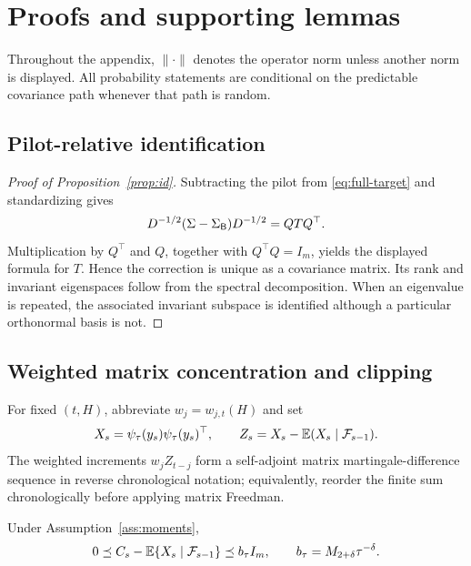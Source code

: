 \section{Proofs and supporting lemmas}
\label{app:proofs}

Throughout the appendix, $\|\cdot\|$ denotes the operator norm unless another norm is displayed.  All probability statements are conditional on the predictable covariance path whenever that path is random.

\subsection{Pilot-relative identification}

\begin{proof}[Proof of Proposition~\ref{prop:id}]
Subtracting the pilot from \eqref{eq:full-target} and standardizing gives
\begin{equation}
 D^{-1/2}(\Sigma-\Sigma_{\mathsf{B}})D^{-1/2}=QTQ^\top.
\end{equation}
Multiplication by $Q^\top$ and $Q$, together with $Q^\top Q=I_m$, yields the displayed formula for $T$.  Hence the correction is unique as a covariance matrix.  Its rank and invariant eigenspaces follow from the spectral decomposition.  When an eigenvalue is repeated, the associated invariant subspace is identified although a particular orthonormal basis is not.
\end{proof}

\subsection{Weighted matrix concentration and clipping}

For fixed $(t,H)$, abbreviate $w_j=w_{j,t}(H)$ and set
\begin{equation}
 X_s=\psi_\tau(y_s)\psi_\tau(y_s)^\top,\qquad
 Z_s=X_s-\mathbb{E}(X_s\mid\mathcal{F}_{s-1}).
\end{equation}
The weighted increments $w_jZ_{t-j}$ form a self-adjoint matrix martingale-difference sequence in reverse chronological notation; equivalently, reorder the finite sum chronologically before applying matrix Freedman.

\begin{lemma}
\label{lem:clipping}
Under Assumption~\ref{ass:moments},
\begin{equation}
 0\preceq C_s-\mathbb{E}\{X_s\mid\mathcal{F}_{s-1}\}\preceq b_\tau I_m,
 \qquad b_\tau=M_{2+\delta}\tau^{-\delta}.
\end{equation}
\end{lemma}

